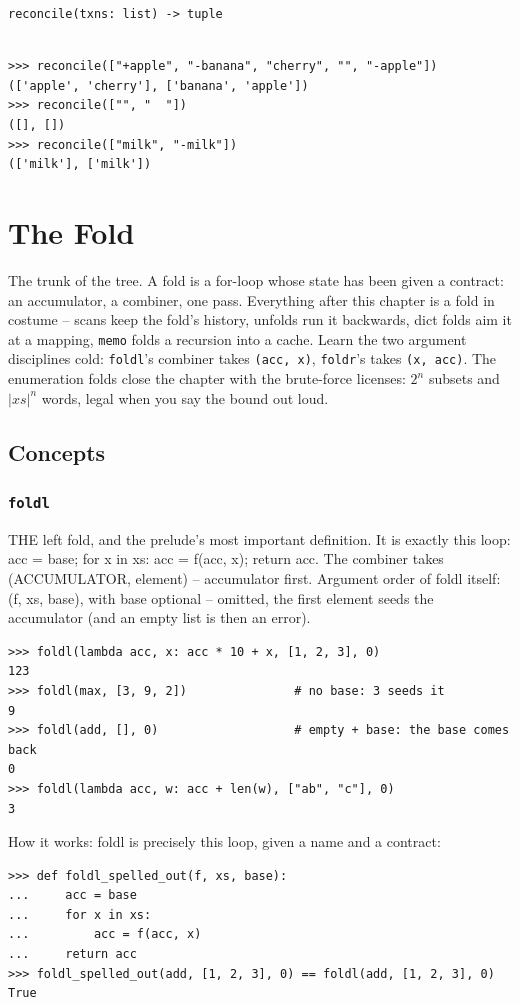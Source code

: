\documentclass[10pt,letterpaper]{book}
\begin{document}
\noindent\texttt{reconcile(txns: list) -> tuple}
\begin{lstlisting}[style=ex]

>>> reconcile(["+apple", "-banana", "cherry", "", "-apple"])
(['apple', 'cherry'], ['banana', 'apple'])
>>> reconcile(["", "  "])
([], [])
>>> reconcile(["milk", "-milk"])
(['milk'], ['milk'])

\end{lstlisting}
\clearpage
\chapter{The Fold}

The trunk of the tree. A fold is a for-loop whose state has been given a
contract: an accumulator, a combiner, one pass. Everything after this chapter
is a fold in costume -- scans keep the fold's history, unfolds run it
backwards, dict folds aim it at a mapping, \texttt{memo} folds a recursion
into a cache. Learn the two argument disciplines cold: \texttt{foldl}'s
combiner takes \texttt{(acc, x)}, \texttt{foldr}'s takes \texttt{(x, acc)}.
The enumeration folds close the chapter with the brute-force licenses:
$2^n$ subsets and $|xs|^n$ words, legal when you say the bound out loud.
\section{Concepts}
\subsection{\texttt{foldl}}\label{def:foldl}
THE left fold, and the prelude's most important definition. It is exactly this loop: acc = base; for x in xs: acc = f(acc, x); return acc. The combiner takes (ACCUMULATOR, element) -- accumulator first. Argument order of foldl itself: (f, xs, base), with base optional -- omitted, the first element seeds the accumulator (and an empty list is then an error).
\begin{lstlisting}[style=ex]
>>> foldl(lambda acc, x: acc * 10 + x, [1, 2, 3], 0)
123
>>> foldl(max, [3, 9, 2])               # no base: 3 seeds it
9
>>> foldl(add, [], 0)                   # empty + base: the base comes back
0
>>> foldl(lambda acc, w: acc + len(w), ["ab", "c"], 0)
3
\end{lstlisting}

How it works: foldl is precisely this loop, given a name and a contract:

\begin{lstlisting}[style=ex]
>>> def foldl_spelled_out(f, xs, base):
...     acc = base
...     for x in xs:
...         acc = f(acc, x)
...     return acc
>>> foldl_spelled_out(add, [1, 2, 3], 0) == foldl(add, [1, 2, 3], 0)
True
\end{lstlisting}
\end{document}
